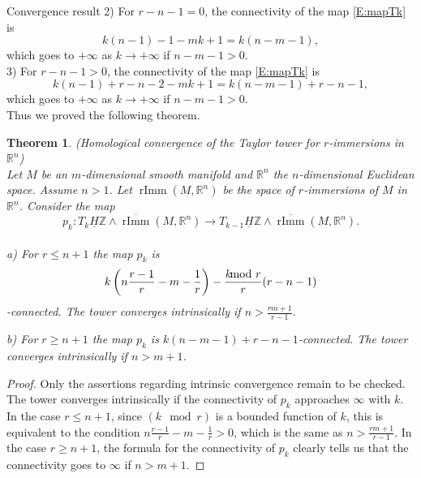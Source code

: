\documentclass[12pt]{amsart}
\newcommand{\R}{{\mathbb R}}
\newcommand{\Z}{{\mathbb Z}}
\newcommand{\rImm}{\operatorname{rImm}}
\newcommand{\rbar}{\overline{\rImm}}
\newcommand{\HZ}{\underline{H}\Z}
\theoremstyle{plain}
\newtheorem{thm}{Theorem}[section]
\theoremstyle{definition}
\theoremstyle{remark}
\begin{document}
\begin{section}{Convergence result}
2)  For $r-n-1=0$, the connectivity of the map \eqref{E:mapTk} is
\begin{equation}\label{E:Conn:r-n-1=0}
k(n-1)-1-mk+1=k(n-m-1),
\end{equation}
which goes to $+\infty$ as $k\longrightarrow +\infty$ if $n-m-1>0$.\\

3) For $r-n-1>0$, the connectivity of the map \eqref{E:mapTk} is
\begin{equation}\label{E:Conn:r-n-1>0}
k(n-1)+r-n-2-mk+1=k(n-m-1)+r-n-1,
\end{equation}
which goes to $+\infty$ as $k\longrightarrow +\infty$ if $n-m-1>0$.\\

Thus we proved the following theorem.
\begin{thm} (Homological convergence of the Taylor tower for $r$-immersions in $\mathbb R^n$)\label{T:Convergence}\\
Let $M$ be an $m$-dimensional smooth manifold and $\R^n$ the $n$-dimensional Euclidean space. Assume $n>1$. Let $\rImm(M,\R^n)$ be the space of $r$-immersions of $M$ in $\R^n$. Consider the map
\begin{equation*}
p_k\colon T_k\HZ\wedge \rbar(M, \R^n)\to T_{k-1}\HZ\wedge \rbar(M, \R^n).
\end{equation*}
\\
a) For $r\le n+1$ the map $p_k$ is $$k\left(n\frac{r-1}{r}-m-\frac{1}{r}\right)-\frac{k\hspace{-8pt}\mod r}{r} (r-n-1)$$-connected. The tower converges intrinsically if $n>\frac{rm+1}{r-1}.$

b)  For $r \ge n+1$ the map $p_k$ is $k(n-m-1)+r-n-1$-connected. The tower converges intrinsically if $n> m+1$.
\end{thm}
\begin{proof}
Only the assertions regarding intrinsic convergence remain to be checked. The tower converges intrinsically if the connectivity of $p_k$ approaches $\infty$ with $k$. In the case $r\le n+1$, since $(k\!\!\mod r)$ is a bounded function of $k$, this is equivalent to the condition $n\frac{r-1}{r}-m-\frac{1}{r}>0$, which is the same as $n>\frac{rm+1}{r-1}$. In the case $r\ge n+1$, the formula for the connectivity of $p_k$ clearly tells us that the connectivity goes to $\infty$ if $n>m+1$. \end{proof}

\end{section}
\end{document}
